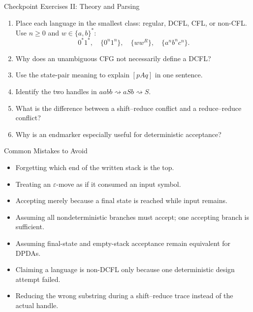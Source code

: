 \documentclass[10pt]{beamer}
\begin{document}
\begin{frame}{Checkpoint Exercises II: Theory and Parsing}
  \small
  \begin{enumerate}
    \item Place each language in the smallest class: regular, DCFL, CFL, or non-CFL.
      Use $n\ge0$ and $w\in\{a,b\}^*$:
      \[
        0^*1^*,\quad \{0^n1^n\},\quad \{ww^R\},\quad \{a^n b^n c^n\}.
      \]
    \item Why does an unambiguous CFG not necessarily define a DCFL?
    \item Use the state-pair meaning to explain $[pAq]$ in one sentence.
    \item Identify the two handles in $aabb\rightsquigarrow aSb\rightsquigarrow S$.
    \item What is the difference between a shift--reduce conflict and a reduce--reduce conflict?
    \item Why is an endmarker especially useful for deterministic acceptance?
  \end{enumerate}
\end{frame}

\begin{frame}{Common Mistakes to Avoid}
  \begin{itemize}
    \item Forgetting which end of the written stack is the top.
    \item Treating an $\varepsilon$-move as if it consumed an input symbol.
    \item Accepting merely because a final state is reached while input remains.
    \item Assuming all nondeterministic branches must accept; one accepting branch is sufficient.
    \item Assuming final-state and empty-stack acceptance remain equivalent for DPDAs.
    \item Claiming a language is non-DCFL only because one deterministic design attempt failed.
    \item Reducing the wrong substring during a shift--reduce trace instead of the actual handle.
  \end{itemize}
\end{frame}
\end{document}
